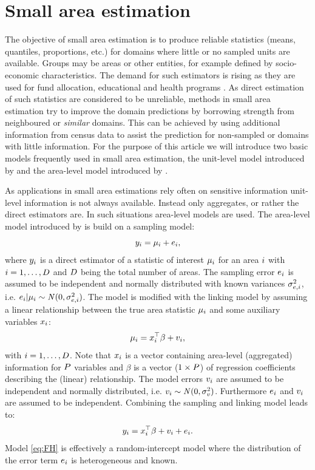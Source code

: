 \documentclass[article]{ajs}
\begin{document}
\section{Small area estimation}
The objective of small area estimation is to produce reliable statistics (means, quantiles, proportions, etc.) for domains where little or no sampled units are available. Groups may be areas or other entities, for example defined by socio-economic characteristics. The demand for such estimators is rising as they are used for fund allocation, educational and health programs \citep{pfeffermann13}. As direct estimation of such statistics are considered to be unreliable, methods in small area estimation try to improve the domain predictions by borrowing strength from neighboured or \textit{similar} domains. This can be achieved by using additional information from census data to assist the prediction for non-sampled or domains with little information. For the purpose of this article we will introduce two basic models frequently used in small area estimation, the unit-level model introduced by \cite{battese1988} and the area-level model introduced by \cite{fay79}.

As applications in small area estimations rely often on sensitive information unit-level information is not always available. Instead only aggregates, or rather the direct estimators are. In such situations area-level models are used. The area-level model introduced by \cite{fay79} is build on a sampling model:
%
\[y_{i} = \mu_{i} + e_{i},\]
%
where $y_{i}$ is a direct estimator of a statistic of interest $\mu_{i}$ for an area $i$ with $i = 1, \dots, D$ and $D$ being the total number of areas. The sampling error $e_{i}$ is assumed to be independent and normally distributed with known variances $\sigma_{e, i}^2$, i.e. $e_{i}|\mu_{i} \sim \mathit{N}(0, \sigma_{e, i}^2)$. The model is modified with the linking model by assuming a linear relationship between the true area statistic $\mu_{i}$ and some auxiliary variables $x_{i}$:
%
\[\mu_{i} = x_{i}^\top \beta + v_{i},\] 
%
with $i=1,\dots, D$. Note that $x_{i}$ is a vector containing area-level (aggregated) information for $P$ variables and $\beta$ is a vector ($1\times P$) of regression coefficients describing the (linear) relationship. The model errors $v_{i}$ are assumed to be independent and normally distributed, i.e. $v_{i} \sim \mathit{N}(0, \sigma_v^2)$. Furthermore $e_{i}$ and $v_{i}$ are assumed to be independent. Combining the sampling and linking model leads to:
\begin{equation}
\label{eq:FH}
y_{i} = x_{i}^\top \beta + v_{i} + e_{i}.
\end{equation} 
%
Model \ref{eq:FH} is effectively a random-intercept model where the distribution of the error term $e_{i}$ is heterogeneous and known. 
\end{document}
